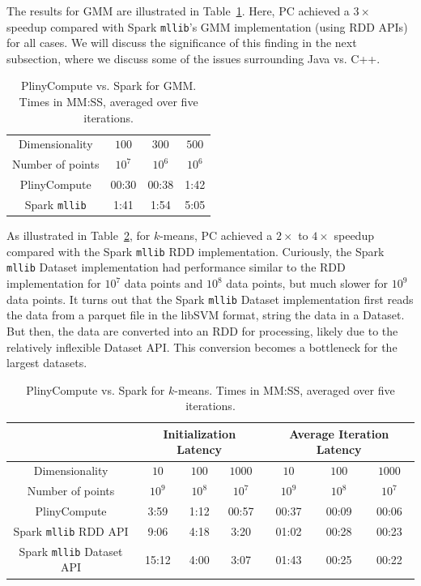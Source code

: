 The results for GMM are illustrated in Table~\ref{fig:Gmm}. Here, PC achieved a 
$3\times$ speedup compared with Spark \texttt{mllib}'s GMM implementation
(using RDD APIs) for all cases.  We will discuss the significance of this finding in the next subsection, where we discuss
some of the issues surrounding Java vs. C++.  

\begin{table}[h!]
\small
\begin{center}
\begin{tabular}{|c||c|c|c||}
\hline
Dimensionality & $100$ & $300$ & $500$ \\
Number of points & $10^7$ & $10^6$ & $10^6$ \\
\hline
\hline
PlinyCompute &00:30 & 00:38 & 1:42 \\
Spark \texttt{mllib} &1:41  &1:54 &5:05 \\
\hline
\end{tabular}
\caption{PlinyCompute vs. Spark for GMM. Times in MM:SS, averaged over five iterations.}
\label{fig:Gmm}
\end{center}
\end{table}



As illustrated in Table~\ref{fig:KMeans}, for $k$-means, PC achieved a $2\times$ to
$4\times$ speedup compared with the Spark \texttt{mllib} RDD implementation.
Curiously, the Spark \texttt{mllib} Dataset implementation
had performance similar to the RDD implementation for
$10^7$ data points and $10^8$ data
points, but much slower for $10^9$ data points. It turns out that 
the Spark \texttt{mllib} Dataset implementation first reads the data 
from a parquet file in the libSVM format, string the data in a Dataset.  But then, the data
are converted into an RDD for processing, likely due to the relatively inflexible Dataset API.
This conversion becomes a bottleneck for the largest datasets.

\begin{table}[h!]
\small
\begin{center}
\begin{tabular}{|c||c|c|c||c|c|c||}
\hline
& \multicolumn{3}{c||}{Initialization Latency} & \multicolumn{3}{c||}{Average
                                         Iteration Latency} \\
\hline
Dimensionality & $10$ & $100$ & $1000$ & $10$ & $100$ & $1000$\\
Number of points & $10^9$ & $10^8$ & $10^7$ & $10^9$ & $10^8$ & $10^7$\\
\hline
PlinyCompute &3:59 & 1:12 & 00:57 &00:37 & 00:09 & 00:06\\
Spark \texttt{mllib} RDD API &9:06  &4:18 &3:20 &01:02 & 00:28 & 00:23\\
Spark \texttt{mllib} Dataset API &15:12  &4:00 &3:07 &01:43 & 00:25 & 00:22\\
\hline
\end{tabular}
\caption{PlinyCompute vs. Spark for $k$-means. Times in MM:SS, averaged over five iterations.}
\label{fig:KMeans}
\end{center}
\end{table}


